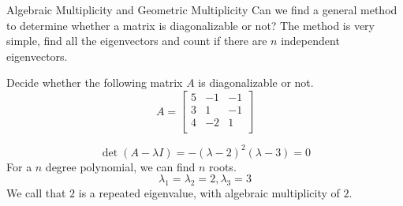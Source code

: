 \documentclass{beamer}
\begin{document}
\begin{frame}{Algebraic Multiplicity and Geometric Multiplicity}
Can we find a general method to determine whether a matrix is diagonalizable or not? The method is very simple, find all the eigenvectors and count if there are $n$ independent eigenvectors.

\begin{example}
    Decide whether the following matrix $A$ is diagonalizable or not.
    \begin{equation*}
        A=\left[ \begin{matrix}
            5&		-1&		-1\\
            3&		1&		-1\\
            4&		-2&		1\\
        \end{matrix} \right]
    \end{equation*}
\end{example}
\begin{equation*}
    \det \left( A-\lambda I \right) =-\left( \lambda -2 \right) ^2\left( \lambda -3 \right)=0
\end{equation*}
For a $n$ degree polynomial, we can find $n$ roots.
\begin{equation*}
    \lambda _1=\lambda _2=2,\lambda _3=3
\end{equation*}
We call that $2$ is a repeated eigenvalue, with algebraic multiplicity of $2$.
\end{frame}
\end{document}
